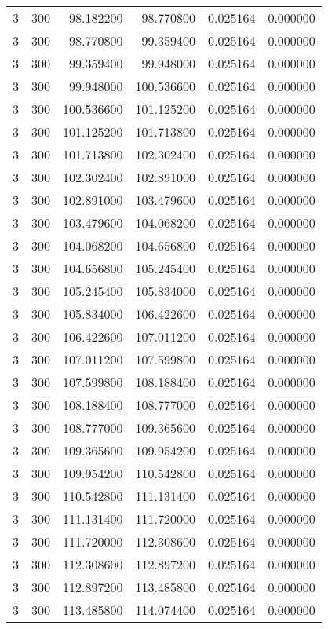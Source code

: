 \begin{longtable}{rrrrrr}
3 & 300 & 98.182200 & 98.770800 & 0.025164 & 0.000000 \\
3 & 300 & 98.770800 & 99.359400 & 0.025164 & 0.000000 \\
3 & 300 & 99.359400 & 99.948000 & 0.025164 & 0.000000 \\
3 & 300 & 99.948000 & 100.536600 & 0.025164 & 0.000000 \\
3 & 300 & 100.536600 & 101.125200 & 0.025164 & 0.000000 \\
3 & 300 & 101.125200 & 101.713800 & 0.025164 & 0.000000 \\
3 & 300 & 101.713800 & 102.302400 & 0.025164 & 0.000000 \\
3 & 300 & 102.302400 & 102.891000 & 0.025164 & 0.000000 \\
3 & 300 & 102.891000 & 103.479600 & 0.025164 & 0.000000 \\
3 & 300 & 103.479600 & 104.068200 & 0.025164 & 0.000000 \\
3 & 300 & 104.068200 & 104.656800 & 0.025164 & 0.000000 \\
3 & 300 & 104.656800 & 105.245400 & 0.025164 & 0.000000 \\
3 & 300 & 105.245400 & 105.834000 & 0.025164 & 0.000000 \\
3 & 300 & 105.834000 & 106.422600 & 0.025164 & 0.000000 \\
3 & 300 & 106.422600 & 107.011200 & 0.025164 & 0.000000 \\
3 & 300 & 107.011200 & 107.599800 & 0.025164 & 0.000000 \\
3 & 300 & 107.599800 & 108.188400 & 0.025164 & 0.000000 \\
3 & 300 & 108.188400 & 108.777000 & 0.025164 & 0.000000 \\
3 & 300 & 108.777000 & 109.365600 & 0.025164 & 0.000000 \\
3 & 300 & 109.365600 & 109.954200 & 0.025164 & 0.000000 \\
3 & 300 & 109.954200 & 110.542800 & 0.025164 & 0.000000 \\
3 & 300 & 110.542800 & 111.131400 & 0.025164 & 0.000000 \\
3 & 300 & 111.131400 & 111.720000 & 0.025164 & 0.000000 \\
3 & 300 & 111.720000 & 112.308600 & 0.025164 & 0.000000 \\
3 & 300 & 112.308600 & 112.897200 & 0.025164 & 0.000000 \\
3 & 300 & 112.897200 & 113.485800 & 0.025164 & 0.000000 \\
3 & 300 & 113.485800 & 114.074400 & 0.025164 & 0.000000 \\

\end{longtable}

